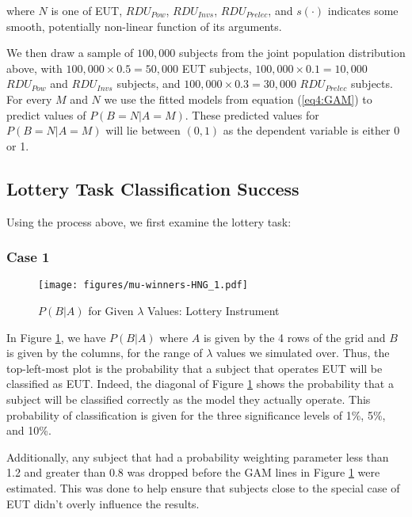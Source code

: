\documentclass[../main.tex]{subfiles}
\begin{document}
\noindent where $N$ is one of EUT, $\mathit{RDU_{Pow}}$, $\mathit{RDU_{Invs}}$, $\mathit{RDU_{Prelec}}$, and $s(\cdot)$ indicates some smooth, potentially non-linear function of its arguments.

We then draw a sample of $100,000$ subjects from the joint population distribution above, with $100,000 \times 0.5 = 50,000$ EUT subjects, $100,000 \times 0.1 = 10,000$ $\mathit{RDU_{Pow}}$ and $\mathit{RDU_{Invs}}$ subjects, and $100,000 \times 0.3 = 30,000$ $\mathit{RDU_{Prelec}}$ subjects.
For every $M$ and $N$ we use the fitted models from equation (\ref{eq4:GAM}) to predict values of $P(B = N | A = M)$.
These predicted values for $P(B = N | A = M)$ will lie between $(0, 1)$ as the dependent variable is either 0 or 1.

\subsection{ \texorpdfstring{\textcite{Harrison2016}}{Harrison and Ng (2016)} Lottery Task Classification Success}

Using the process above, we first examine the \textcite{Harrison2016} lottery task:

\subsubsection{Case 1}

\begin{figure}[hp!]
	\center
	\caption{$P(B|A)$ for Given $\lambda$ Values: \textcite{Harrison2016} Lottery Instrument}
	\texttt{[image: figures/mu-winners-HNG\_1.pdf]}
	\label{fig:HNG_mu_PBA}
\end{figure}

In Figure \ref{fig:HNG_mu_PBA}, we have $P(B|A)$ where $A$ is given by the 4 rows of the grid and $B$ is given by the columns, for the range of $\lambda$ values we simulated over.
Thus, the top-left-most plot is the probability that a subject that operates EUT will be classified as EUT.
Indeed, the diagonal of Figure \ref{fig:HNG_mu_PBA} shows the probability that a subject will be classified correctly as the model they actually operate.
This probability of classification is given for the three significance levels of 1\%, 5\%, and 10\%.

Additionally, any subject that had a probability weighting parameter less than 1.2 and greater than 0.8 was dropped before the GAM lines in Figure \ref{fig:HNG_mu_PBA} were estimated.
This was done to help ensure that subjects close to the special case of EUT didn't overly influence the results.
\end{document}
